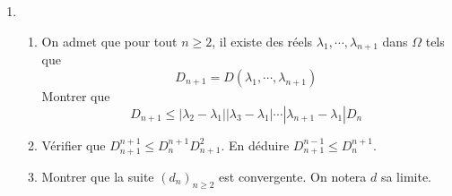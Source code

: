\begin{enumerate}
 \item
\begin{enumerate}
 \item  On admet que pour tout $n\geq2$, il existe des réels $\lambda_1, \cdots , \lambda_{n+1}$ dans $\Omega$ tels que 
\begin{displaymath}
 D_{n+1}=D(\lambda_1, \cdots , \lambda_{n+1})
\end{displaymath}
Montrer que 
\begin{displaymath}
 D_{n+1} \leq |\lambda_2 -\lambda_1||\lambda_3 -\lambda_1|\cdots |\lambda_{n+1} -\lambda_1|D_n
\end{displaymath}
\item Vérifier que $D_{n+1}^{n+1}\leq D_{n}^{n+1}D_{n+1}^{2}$. En déduire  $D_{n+1}^{n-1}\leq D_{n}^{n+1}$.
\item Montrer que la suite $(d_n)_{n\geq 2}$ est convergente. On notera $d$ sa limite.
\end{enumerate}


\end{enumerate}
